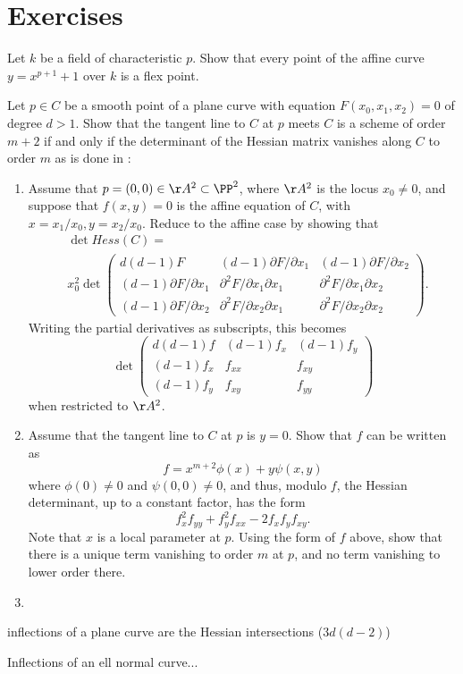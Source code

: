 \section{Exercises}
\begin{exercise}\label{inseparable Gauss}
Let $k$ be a field of characteristic $p$. Show that every point of the affine curve $y = x^{p+1}+1$ over $k$ is a flex point.
 
\end{exercise}

\begin{exercise}\label{Hessian exercise} 
Let $p\in C$ be a smooth point of a  plane curve with equation $F(x_0,x_1,x_2) = 0$ of degree $d>1$. Show that the tangent line to $C$ at $p$ meets
$C$ is a scheme of order $m+2$ if and only if the determinant of the Hessian matrix vanishes
along $C$ to order $m$ as is done in \cite[pp. 84--85]{Kunz}:

\begin{enumerate}
\item Assume that $p = (0,0)\in \AA^2\subset \PP^2$, where $\AA^2$ is the locus $x_0\neq 0$, 
and suppose that $f(x,y) =0$ is the affine equation of $C$, with $x= x_1/x_0, y = x_2/x_0$.
Reduce to the affine case by showing that
$$
\begin{aligned}
&\det Hess(C) = \\
&x_0^2 \det 
\begin{pmatrix}
 d(d-1)F & (d-1) \partial F/\partial x_1 & (d-1) \partial F/\partial x_2 \\
 (d-1) \partial F/\partial x_1&\partial^2 F/\partial x_1 \partial x_1 & \partial^2 F/\partial x_1 \partial x_2\\
 (d-1) \partial F/\partial x_2 &\partial^2 F/\partial x_2 \partial x_1 & \partial^2 F/\partial x_2 \partial x_2 
\end{pmatrix} .
\end{aligned}
$$ 
Writing the partial derivatives as subscripts, this becomes
$$
\det \begin{pmatrix}
 d(d-1)f & (d-1) f_x & (d-1) f_y \\
 (d-1) f_x&f_{xx} & f_{xy}\\
 (d-1) f_y &f_{xy} & f_{yy}
\end{pmatrix}
$$ 
when restricted to $\AA^2$.

\item Assume that the tangent line to $C$ at $p$ is $y=0$. Show that $f$ can be written as
$$
f = x^{m+2}\phi(x) +y\psi(x,y)
$$
where $\phi(0) \neq 0$ and $\psi(0,0) \neq 0$, and thus, modulo $f$, the Hessian determinant,
up to a constant factor, 
has the form
$$
f_x^2f_{yy}+f_y^2f_{xx}-2f_xf_yf_{xy}.
$$
Note that $x$ is a local parameter at $p$. Using the form of $f$ above, show that there is a unique term vanishing to order $m$ at $p$,
and no term vanishing to lower order there.
\item
\end{enumerate}
\end{exercise}

\begin{exercise}\label{Hessian exercise}
 inflections of a plane curve are the Hessian intersections ($3d(d-2)$)
\end{exercise}

\begin{exercise}
 Inflections of an ell normal curve...
\end{exercise}
